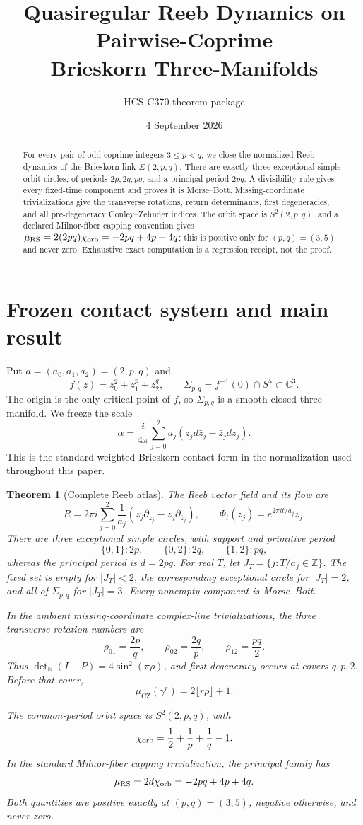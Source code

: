 \documentclass[10pt]{article}
\title{Quasiregular Reeb Dynamics on Pairwise-Coprime\\Brieskorn Three-Manifolds}
\author{HCS-C370 theorem package}
\date{4 September 2026}
\newcommand{\CC}{\mathbb C}
\newcommand{\ZZ}{\mathbb Z}
\newcommand{\CZ}{\mathrm{CZ}}
\newcommand{\RS}{\mathrm{RS}}
\newtheorem{theorem}{Theorem}
\begin{document}
\maketitle

\begin{abstract}
For every pair of odd coprime integers $3\leq p<q$, we close the normalized
Reeb dynamics of the Brieskorn link $\Sigma(2,p,q)$.  There are exactly three
exceptional simple orbit circles, of periods $2p,2q,pq$, and a principal period
$2pq$.  A divisibility rule gives every fixed-time component and proves it is
Morse--Bott.  Missing-coordinate trivializations give the transverse rotations,
return determinants, first degeneracies, and all pre-degeneracy
Conley--Zehnder indices.  The orbit space is $S^2(2,p,q)$, and a declared
Milnor-fiber capping convention gives
$\mu_{\RS}=2(2pq)\chi_{\rm orb}=-2pq+4p+4q$; this is positive only for
$(p,q)=(3,5)$ and never zero.  Exhaustive exact computation is a regression
receipt, not the proof.
\end{abstract}

\section{Frozen contact system and main result}
Put $a=(a_0,a_1,a_2)=(2,p,q)$ and
\[
 f(z)=z_0^2+z_1^p+z_2^q,\qquad
 \Sigma_{p,q}=f^{-1}(0)\cap S^5\subset\CC^3.
\]
The origin is the only critical point of $f$, so $\Sigma_{p,q}$ is a smooth
closed three-manifold.  We freeze the scale
\[
 \alpha=\frac{i}{4\pi}\sum_{j=0}^2a_j
 (z_jd\bar z_j-\bar z_jdz_j).
\]
This is the standard weighted Brieskorn contact form in the normalization used
throughout this paper.

\begin{theorem}[Complete Reeb atlas]
The Reeb vector field and its flow are
\[
 R=2\pi i\sum_{j=0}^2\frac1{a_j}
 (z_j\partial_{z_j}-\bar z_j\partial_{\bar z_j}),\qquad
 \Phi_t(z_j)=e^{2\pi it/a_j}z_j.
\]
There are three exceptional simple circles, with support and primitive period
\[
 \{0,1\}:2p,\qquad \{0,2\}:2q,\qquad \{1,2\}:pq,
\]
whereas the principal period is $d=2pq$.  For real $T$, let
$J_T=\{j:T/a_j\in\ZZ\}$.  The fixed set is empty for $|J_T|<2$, the
corresponding exceptional circle for $|J_T|=2$, and all of $\Sigma_{p,q}$ for
$|J_T|=3$.  Every nonempty component is Morse--Bott.

In the ambient missing-coordinate complex-line trivializations, the three
transverse rotation numbers are
\[
 \rho_{01}=\frac{2p}{q},\qquad \rho_{02}=\frac{2q}{p},\qquad
 \rho_{12}=\frac{pq}{2}.
\]
Thus $\det_{\mathbb R}(I-P)=4\sin^2(\pi\rho)$, and first degeneracy occurs at
covers $q,p,2$.  Before that cover,
\[
 \mu_{\CZ}(\gamma^r)=2\lfloor r\rho\rfloor+1.
\]

The common-period orbit space is $S^2(2,p,q)$, with
\[
 \chi_{\rm orb}=\frac12+\frac1p+\frac1q-1.
\]
In the standard Milnor-fiber capping trivialization, the principal family has
\[
 \mu_{\RS}=2d\chi_{\rm orb}=-2pq+4p+4q.
\]
Both quantities are positive exactly at $(p,q)=(3,5)$, negative otherwise,
and never zero.
\end{theorem}
\end{document}
